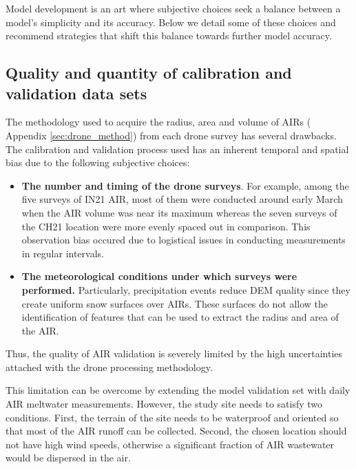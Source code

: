 
Model development is an art where subjective choices seek a balance between a model's simplicity and its accuracy.
Below we detail some of these choices and recommend strategies that shift this balance towards further model
accuracy.

\subsection{Quality and quantity of calibration and validation data sets}

The methodology used to acquire the radius, area and volume of \ac{AIRs} ( Appendix \ref{sec:drone_method}) from
each drone survey has several drawbacks. The calibration and validation process used has an inherent temporal
and spatial bias due to the following subjective choices:

\begin{itemize}
	\item \textbf{The number and timing of the drone surveys}. For example, among the five surveys of IN21 AIR, most of them were
	      conducted around early March when the AIR volume was near its maximum whereas the seven surveys of the CH21
	      location were more evenly spaced out in comparison. This observation bias occured due to logistical issues
	      in conducting measurements in regular intervals.

	\item \textbf{The meteorological conditions under which surveys were performed.} Particularly, precipitation events reduce DEM quality since
	      they create uniform snow surfaces over \ac{AIRs}. These surfaces do not allow the identification of features
	      that can be used to extract the radius and area of the AIR.

\end{itemize}

Thus, the quality of AIR validation is severely limited by the high uncertainties attached with the drone
processing methodology.

This limitation can be overcome by extending the model validation set with daily AIR meltwater measurements.
However, the study site needs to satisfy two conditions. First, the terrain of the site needs to be waterproof
and oriented so that most of the AIR runoff can be collected. Second, the chosen location should not have high
wind speeds, otherwise a significant fraction of AIR wastewater would be dispersed in the air.

